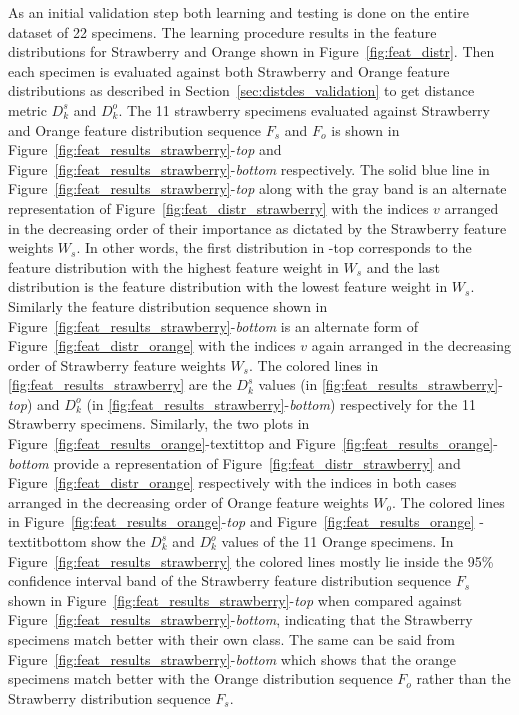 \documentclass {udthesis}
\begin{document}
As an initial validation step both learning and testing is done on the entire dataset of 22 specimens. The learning procedure
results in the feature distributions for Strawberry and Orange shown in Figure~\ref{fig:feat_distr}. Then each specimen is evaluated against both Strawberry and Orange feature distributions as described in Section~\ref{sec:distdes_validation} to get distance metric $D^s_k$ and $D^o_k$. The 11 strawberry specimens evaluated against Strawberry and Orange feature distribution sequence $F_{s}$ and $F_{o}$ is shown in Figure~\ref{fig:feat_results_strawberry}-\textit{top} and Figure~\ref{fig:feat_results_strawberry}-\textit{bottom} respectively. The solid blue line in Figure~\ref{fig:feat_results_strawberry}-\textit{top} along with the gray band is an alternate representation of Figure~\ref{fig:feat_distr_strawberry} with the indices $v$ arranged in the decreasing order of their importance as dictated by the Strawberry feature weights $W_s$. In other words, the first distribution in -top corresponds to the feature distribution with the highest feature weight in $W_{s}$ and the last distribution is the 
feature distribution with the lowest feature weight in $W_{s}$. Similarly the feature distribution sequence shown in Figure~\ref{fig:feat_results_strawberry}-\textit{bottom} is an alternate form of  Figure~\ref{fig:feat_distr_orange} with the indices $v$ again arranged in the decreasing order of Strawberry feature weights $W_s$. The colored lines in \ref{fig:feat_results_strawberry} are the $D^s_k$ values (in \ref{fig:feat_results_strawberry}-\textit{top}) and $D^o_k$ (in \ref{fig:feat_results_strawberry}-\textit{bottom}) respectively for the 11 Strawberry specimens. Similarly, the two plots in Figure~\ref{fig:feat_results_orange}-textit{top} and Figure~\ref{fig:feat_results_orange}-\textit{bottom} provide a representation of Figure~\ref{fig:feat_distr_strawberry} and Figure~\ref{fig:feat_distr_orange} respectively with the indices in both cases arranged in the decreasing order of Orange feature weights $W_o$. The colored lines in Figure~\ref{fig:feat_results_orange}-\textit{top} and Figure~\ref{fig:feat_results_orange}
-textit{bottom} show the $D^s_k$ and $D^o_k$ values of the 11 Orange specimens. In Figure~\ref{fig:feat_results_strawberry} the colored lines mostly lie inside the 95\% confidence interval band of the Strawberry feature distribution sequence $F_s$ shown in Figure~\ref{fig:feat_results_strawberry}-\textit{top} when compared against Figure~\ref{fig:feat_results_strawberry}-\textit{bottom}, indicating that the Strawberry specimens match better with their own class. The same can be said from Figure~\ref{fig:feat_results_strawberry}-\textit{bottom} which shows that the orange specimens match better with the Orange distribution sequence $F_o$ rather than the Strawberry distribution sequence $F_s$.
\end{document}
